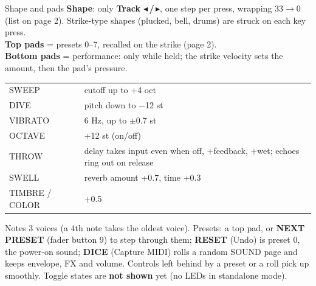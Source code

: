 \documentclass{article}
\begin{document}
\begin{minipage}[t]{66mm}\vspace{0pt}
\begin{card}{Shape and pads}
\textbf{Shape}: only \textbf{Track \(\blacktriangleleft\)\,/\,\(\blacktriangleright\)}, one step per press,
wrapping 33\(\to\)0 (list on page 2). Strike-type shapes (plucked, bell, drums) are struck on each key press.\\[0.5mm]
\textbf{Top pads} = presets 0--7, recalled on the strike (page 2).\\[0.5mm]
\textbf{Bottom pads} = performance: only while held; the strike velocity sets the amount, then the pad's
pressure.
\fontsize{6.6}{7.9}\selectfont
\begin{tabularx}{\linewidth}{@{}l L@{}}
SWEEP & cutoff up to +4 oct \\
DIVE & pitch down to \(-\)12 st \\
VIBRATO & 6 Hz, up to \(\pm\)0.7 st \\
OCTAVE & +12 st (on/off) \\
THROW & delay takes input even when off, +feedback, +wet; echoes ring out on release \\
SWELL & reverb amount +0.7, time +0.3 \\
TIMBRE / COLOR & +0.5 \\
\end{tabularx}
\end{card}
\begin{card}{Notes}
3 voices (a 4th note takes the oldest voice). Presets: a top pad, or \textbf{NEXT PRESET} (fader button 9)
to step through them; \textbf{RESET} (Undo) is preset 0, the power-on sound; \textbf{DICE} (Capture MIDI)
rolls a random SOUND page and keeps envelope, FX and volume. Controls left behind by a preset or a roll
pick up smoothly. Toggle states are \textbf{not shown} yet (no LEDs in standalone mode).
\end{card}
\end{minipage}\hfill
\end{document}
